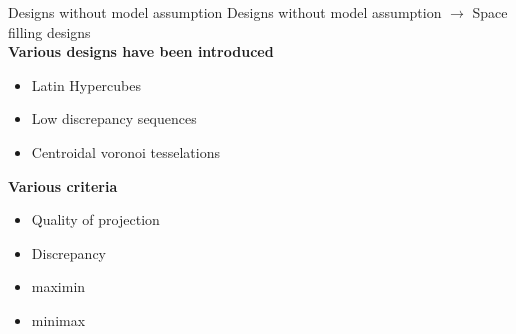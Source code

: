 \documentclass{beamer}
\begin{document}

\begin{frame}{Designs without model assumption}
Designs without model assumption $\rightarrow$ Space filling designs\\ \vspace{3mm}
\textbf{Various designs have been introduced} \vspace{1mm}
	\begin{itemize}
		\item Latin Hypercubes
		\item Low discrepancy sequences
		\item Centroidal voronoi tesselations
	\end{itemize}
\vspace{3mm}
\textbf{Various criteria} \vspace{1mm}
	\begin{itemize}
		\item Quality of projection
		\item Discrepancy
		\item maximin
		\item minimax
	\end{itemize}
\end{frame}
\end{document}
